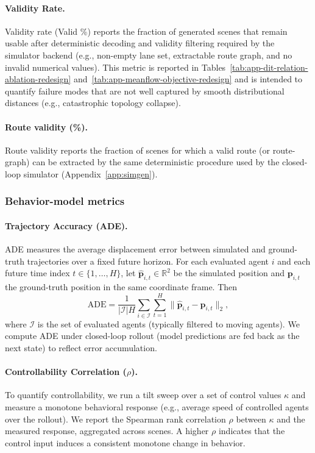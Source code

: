 \documentclass{article}
\theoremstyle{plain}
\theoremstyle{definition}
\theoremstyle{remark}
\begin{document}
\paragraph{Validity Rate.}
Validity rate (Valid \%) reports the fraction of generated scenes that remain usable after deterministic decoding and validity filtering
required by the simulator backend (e.g., non-empty lane set, extractable route graph, and no invalid numerical values).
This metric is reported in Tables~\ref{tab:app-dit-relation-ablation-redesign} and~\ref{tab:app-meanflow-objective-redesign} and is
intended to quantify failure modes that are not well captured by smooth distributional distances (e.g., catastrophic topology collapse).

\paragraph{Route validity (\%).}
Route validity reports the fraction of scenes for which a valid route (or route-graph) can be extracted by the same deterministic procedure used by the closed-loop simulator (Appendix~\ref{app:simgen}).

\subsubsection{Behavior-model metrics}

\paragraph{Trajectory Accuracy (ADE).}
ADE measures the average displacement error between simulated and ground-truth trajectories over a fixed future horizon.
For each evaluated agent \(i\) and each future time index \(t\in\{1,\dots,H\}\), let \(\widehat{\mathbf{p}}_{i,t}\in\mathbb{R}^{2}\) be the
simulated position and \(\mathbf{p}_{i,t}\) the ground-truth position in the same coordinate frame.
Then
\[
\mathrm{ADE}=\frac{1}{|\mathcal{I}|H}\sum_{i\in\mathcal{I}}\sum_{t=1}^{H}\lVert \widehat{\mathbf{p}}_{i,t}-\mathbf{p}_{i,t}\rVert_{2},
\]
where \(\mathcal{I}\) is the set of evaluated agents (typically filtered to moving agents).
We compute ADE under closed-loop rollout (model predictions are fed back as the next state) to reflect error accumulation.

\paragraph{Controllability Correlation (\(\rho\)).}
To quantify controllability, we run a tilt sweep over a set of control values \(\kappa\) and measure a monotone behavioral response
(e.g., average speed of controlled agents over the rollout).
We report the Spearman rank correlation \(\rho\) between \(\kappa\) and the measured response, aggregated across scenes.
A higher \(\rho\) indicates that the control input induces a consistent monotone change in behavior.
\end{document}
